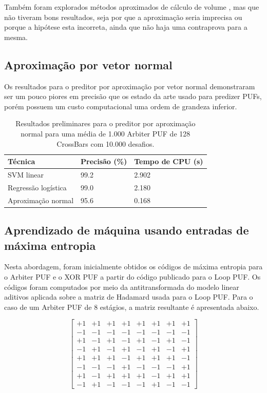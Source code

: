 \documentclass[pdftex,11pt]{article}
\begin{document}
\begin{spacing}{1.5}
Também foram explorados métodos aproximados de cálculo de volume \cite{Enge1998ExactVC},
mas que não tiveram bons resultados, seja por que a aproximação seria
imprecisa ou porque a hipótese esta incorreta, ainda que não haja uma
contraprova para a mesma.

\subsection{Aproximação por vetor normal}

 Os resultados para o preditor por aproximação por vetor normal demonstraram ser um
pouco piores em precisão que os estado da arte usado para predizer PUFs,
porém possuem um custo computacional uma ordem de grandeza inferior.

\begin{table}[H]
\centering
\caption{Resultados preliminares para o preditor por aproximação normal para uma média de 1.000 Arbiter PUF de 128 CrossBars com 10.000 desafios.}
\label{normal-pred}
\begin{tabular}{|l|l|l|}
\hline
Técnica             & Precisão (\%) & Tempo de CPU (s) \\ \hline
SVM linear          & 99.2          & 2.902            \\ \hline
Regressão logística & 99.0          & 2.180            \\ \hline
Aproximação normal  & 95.6          & 0.168            \\ \hline
\end{tabular}
\end{table}


\subsection{Aprendizado de máquina usando entradas de máxima entropia}

Nesta abordagem, foram inicialmente obtidos os códigos de máxima entropia para o Arbiter PUF e o XOR PUF a partir do código publicado para o Loop PUF. Os códigos foram computados por meio da antitransformada do modelo linear aditivos aplicada sobre a matriz de Hadamard usada para o Loop PUF. Para o caso de um Arbiter PUF de 8 estágios, a matriz resultante é apresentada abaixo.


\[
\begin{bmatrix}
    +1 & +1 & +1 & +1 & +1 & +1 & +1 & +1 \\
    -1 & -1 & -1 & -1 & -1 & -1 & -1 & -1 \\
    +1 & -1 & +1 & -1 & +1 & -1 & +1 & -1 \\
    -1 & +1 & -1 & +1 & -1 & +1 & -1 & +1 \\
    +1 & +1 & +1 & -1 & +1 & +1 & +1 & -1 \\
    -1 & -1 & -1 & +1 & -1 & -1 & -1 & +1 \\
    +1 & -1 & +1 & +1 & +1 & -1 & +1 & +1 \\
    -1 & +1 & -1 & -1 & -1 & +1 & -1 & -1
\end{bmatrix}
\]


\end{spacing}
\end{document}
